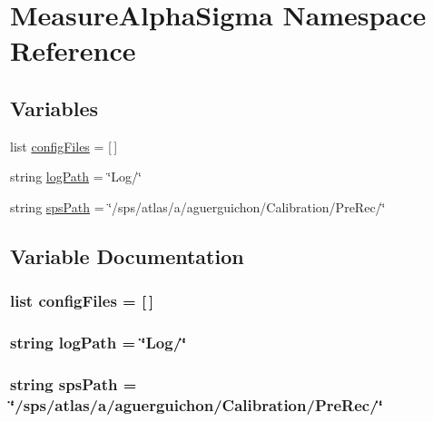 \hypertarget{namespaceMeasureAlphaSigma}{\section{Measure\+Alpha\+Sigma Namespace Reference}
\label{namespaceMeasureAlphaSigma}
}
\subsection*{Variables}
\begin{DoxyCompactItemize}
\item 
list \hyperlink{namespaceMeasureAlphaSigma_a548114e88a3acfb5bec64fb8ce538b06}{config\+Files} = \mbox{[}$\,$\mbox{]}
\item 
string \hyperlink{namespaceMeasureAlphaSigma_a7f4934f0abd9c9e9d1da7b4b49fdfecc}{log\+Path} = \char`\"{}Log/\char`\"{}
\item 
string \hyperlink{namespaceMeasureAlphaSigma_a39fed0b69a85df4512bce32f4810e219}{sps\+Path} = \char`\"{}/sps/atlas/a/aguerguichon/Calibration/Pre\+Rec/\char`\"{}
\end{DoxyCompactItemize}


\subsection{Variable Documentation}
\hypertarget{namespaceMeasureAlphaSigma_a548114e88a3acfb5bec64fb8ce538b06}{
\subsubsection[{config\+Files}]{\setlength{\rightskip}{0pt plus 5cm}list config\+Files = \mbox{[}$\,$\mbox{]}}}\label{namespaceMeasureAlphaSigma_a548114e88a3acfb5bec64fb8ce538b06}
\hypertarget{namespaceMeasureAlphaSigma_a7f4934f0abd9c9e9d1da7b4b49fdfecc}{
\subsubsection[{log\+Path}]{\setlength{\rightskip}{0pt plus 5cm}string log\+Path = \char`\"{}Log/\char`\"{}}}\label{namespaceMeasureAlphaSigma_a7f4934f0abd9c9e9d1da7b4b49fdfecc}
\hypertarget{namespaceMeasureAlphaSigma_a39fed0b69a85df4512bce32f4810e219}{
\subsubsection[{sps\+Path}]{\setlength{\rightskip}{0pt plus 5cm}string sps\+Path = \char`\"{}/sps/atlas/a/aguerguichon/Calibration/Pre\+Rec/\char`\"{}}}\label{namespaceMeasureAlphaSigma_a39fed0b69a85df4512bce32f4810e219}
